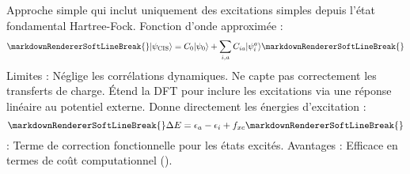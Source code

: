 {}\markdownRendererSectionBegin
{}\markdownRendererInterblockSeparator
{}\markdownRendererOlBeginTight
{}\markdownRendererInterblockSeparator
{}\markdownRendererUlBeginTight
\markdownRendererUlItem Approche simple qui inclut uniquement des excitations simples depuis l’état fondamental Hartree-Fock.\markdownRendererUlItemEnd 
\markdownRendererUlItem Fonction d’onde approximée :\markdownRendererUlItemEnd 
\markdownRendererUlEndTight \markdownRendererOlItemEnd 
\markdownRendererOlEndTight \markdownRendererInterblockSeparator
{}\begin{equation}\markdownRendererSoftLineBreak
{}|\psi_{\text{CIS}}\rangle = C_0 |\psi_0\rangle + \sum_{i,a} C_{ia} |\psi_i^a\rangle\markdownRendererSoftLineBreak
{}\end{equation}\markdownRendererInterblockSeparator
{}\markdownRendererUlBeginTight
\markdownRendererUlItem Limites :\markdownRendererInterblockSeparator
{}\markdownRendererUlBeginTight
\markdownRendererUlItem Néglige les corrélations dynamiques.\markdownRendererUlItemEnd 
\markdownRendererUlItem Ne capte pas correctement les transferts de charge.\markdownRendererUlItemEnd 
\markdownRendererUlEndTight \markdownRendererUlItemEnd 
\markdownRendererUlEndTight \markdownRendererInterblockSeparator
{}\markdownRendererOlBeginTight
{}\markdownRendererInterblockSeparator
{}\markdownRendererUlBeginTight
\markdownRendererUlItem Étend la DFT pour inclure les excitations via une réponse linéaire au potentiel externe.\markdownRendererUlItemEnd 
\markdownRendererUlItem Donne directement les énergies d'excitation :\markdownRendererUlItemEnd 
\markdownRendererUlEndTight \markdownRendererOlItemEnd 
\markdownRendererOlEndTight \markdownRendererInterblockSeparator
{}\begin{equation}\markdownRendererSoftLineBreak
{}\Delta E = \epsilon_a - \epsilon_i + f_{xc}\markdownRendererSoftLineBreak
{}\end{equation}\markdownRendererInterblockSeparator
{}\markdownRendererUlBeginTight
\markdownRendererUlItem {} : Terme de correction fonctionnelle pour les états excités.\markdownRendererUlItemEnd 
\markdownRendererUlItem Avantages :\markdownRendererInterblockSeparator
{}\markdownRendererUlBeginTight
\markdownRendererUlItem Efficace en termes de coût computationnel ().\markdownRendererUlItemEnd 
